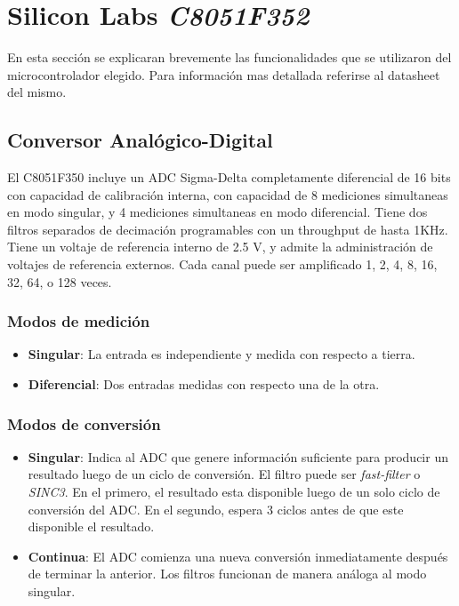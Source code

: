 \section{Silicon Labs \emph{C8051F352}} %
\label{sec:silicon_labs_c8051f352}

En esta sección se explicaran brevemente las funcionalidades que se utilizaron del microcontrolador elegido. Para información mas detallada referirse al datasheet del mismo. \cite{bib:datasheet}

\subsection{Conversor Analógico-Digital} %
\label{sub:conversor_analogico_digital}

El C8051F350 incluye un ADC Sigma-Delta completamente diferencial de 16 bits con capacidad de calibración interna, con capacidad de 8 mediciones simultaneas en modo singular, y 4 mediciones simultaneas en modo diferencial. Tiene dos filtros separados de decimación programables con un throughput de hasta 1KHz. Tiene un voltaje de referencia interno de 2.5 V, y admite la administración de voltajes de referencia externos. Cada canal puede ser amplificado 1, 2, 4, 8, 16, 32, 64, o 128 veces.

\subsubsection{Modos de medición} %
\label{ssub:modos_de_medicion}

\begin{itemize}
  \item \textbf{Singular}: La entrada es independiente y medida con respecto a tierra.
  \item \textbf{Diferencial}: Dos entradas medidas con respecto una de la otra.
\end{itemize}

\subsubsection{Modos de conversión} %
\label{ssub:modos_de_conversion}

\begin{itemize}
  \item \textbf{Singular}: Indica al ADC que genere información suficiente para producir un resultado luego de un ciclo de conversión. El filtro puede ser \emph{fast-filter} o \emph{SINC3}. En el primero, el resultado esta disponible luego de un solo ciclo de conversión del ADC. En el segundo, espera 3 ciclos antes de que este disponible el resultado.
  \item \textbf{Continua}: El ADC comienza una nueva conversión inmediatamente después de terminar la anterior. Los filtros funcionan de manera análoga al modo singular.
\end{itemize}

